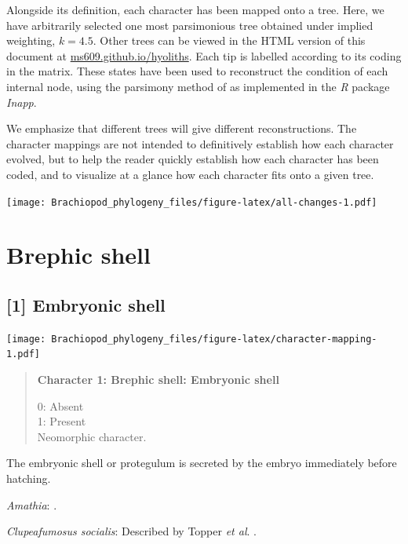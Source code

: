 \documentclass[openany]{book}
\begin{document}
Alongside its definition, each character has been mapped onto a tree.
Here, we have arbitrarily selected one most parsimonious tree obtained
under implied weighting, \(k = 4.5\). Other trees can be viewed in the
HTML version of this document at
\href{https://ms609.github.io/hyoliths/reconstructions.html}{ms609.github.io/hyoliths}.
Each tip is labelled according to its coding in the matrix. These states
have been used to reconstruct the condition of each internal node, using
the parsimony method of \citet{Brazeau2018} as implemented in the
\emph{R} package \emph{Inapp}.

We emphasize that different trees will give different reconstructions.
The character mappings are not intended to definitively establish how
each character evolved, but to help the reader quickly establish how
each character has been coded, and to visualize at a glance how each
character fits onto a given tree.







\texttt{[image: Brachiopod\_phylogeny\_files/figure-latex/all-changes-1.pdf]}

\section{Brephic shell}\label{brephic-shell}

\subsection*{{[}1{]} Embryonic shell}\label{embryonic-shell}

\texttt{[image: Brachiopod\_phylogeny\_files/figure-latex/character-mapping-1.pdf]}

\begin{quote}
\textbf{Character 1: Brephic shell: Embryonic shell}

0: Absent\\
1: Present\\
Neomorphic character.
\end{quote}

The embryonic shell or protegulum is secreted by the embryo immediately
before hatching.

\hypertarget{Amathia-coding-1}{}
\emph{Amathia}: \citet{Reed1982}.

\hypertarget{Clupeafumosus_socialis-coding-1}{}
\emph{Clupeafumosus socialis}: Described by Topper \emph{et al}.
\citeyearpar{Topper2013Reappraisalof}.
\end{document}
